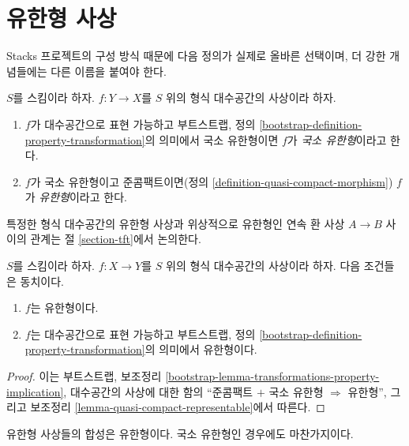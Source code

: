 \section{유한형 사상}
\label{section-finite-type}

\noindent
Stacks 프로젝트의 구성 방식 때문에 다음 정의가 실제로 올바른
선택이며, 더 강한 개념들에는 다른 이름을 붙여야 한다. %

\begin{definition}
\label{definition-finite-type}
$S$를 스킴이라 하자. $f : Y \to X$를 $S$ 위의 형식 대수공간의
사상이라 하자.
\begin{enumerate}
\item $f$가 대수공간으로 표현 가능하고 부트스트랩, 정의
\ref{bootstrap-definition-property-transformation}의 의미에서 국소
유한형이면 $f$가 {\it 국소 유한형}이라고 한다.
\item $f$가 국소 유한형이고 준콤팩트이면(정의
\ref{definition-quasi-compact-morphism}) $f$가 {\it 유한형}이라고
한다.
\end{enumerate}
\end{definition}

\noindent
특정한 형식 대수공간의 유한형 사상과 위상적으로 유한형인 연속 환
사상 $A \to B$ 사이의 관계는 절 \ref{section-tft}에서 논의한다.

\begin{lemma}
\label{lemma-characterize-finite-type}
$S$를 스킴이라 하자. $f : X \to Y$를 $S$ 위의 형식 대수공간의
사상이라 하자. 다음 조건들은 동치이다.
\begin{enumerate}
\item $f$는 유한형이다.
\item $f$는 대수공간으로 표현 가능하고 부트스트랩, 정의
\ref{bootstrap-definition-property-transformation}의 의미에서
유한형이다.
\end{enumerate}
\end{lemma}

\begin{proof}
이는 부트스트랩, 보조정리
\ref{bootstrap-lemma-transformations-property-implication}, 대수공간의
사상에 대한 함의 ``준콤팩트 $+$ 국소 유한형
$\Rightarrow$ 유한형'', 그리고 보조정리
\ref{lemma-quasi-compact-representable}에서 따른다.
\end{proof}

\begin{lemma}
\label{lemma-composition-finite-type}
유한형 사상들의 합성은 유한형이다. 국소 유한형인 경우에도
마찬가지이다.
\end{lemma}

